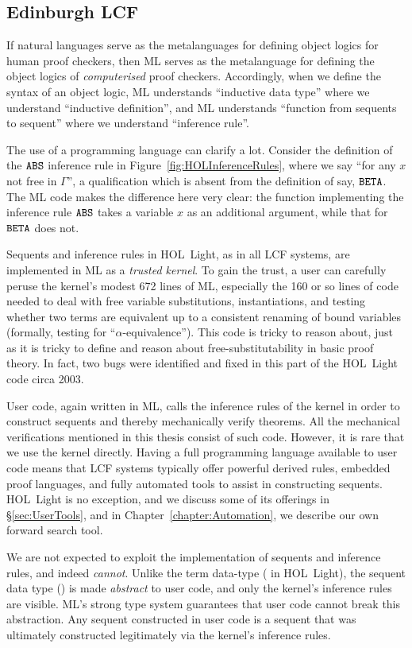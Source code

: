 \subsection{Edinburgh LCF}
If natural languages serve as the metalanguages for defining object logics for human proof checkers, then ML serves as the metalanguage for defining the object logics of \emph{computerised} proof checkers. Accordingly, when we define the syntax of an object logic, ML understands ``inductive data type'' where we understand ``inductive definition'', and ML understands ``function from sequents to sequent'' where we understand ``inference rule''.

The use of a programming language can clarify a lot. Consider the definition of the $\texttt{ABS}$ inference rule in Figure~\ref{fig:HOLInferenceRules}, where we say ``for any $x$ not free in $\Gamma$'', a qualification which is absent from the definition of say, $\texttt{BETA}$. The ML code makes the difference here very clear: the function implementing the inference rule $\texttt{ABS}$ takes a variable $x$ as an additional argument, while that for $\texttt{BETA}$ does not.

Sequents and inference rules in HOL~Light, as in all LCF systems, are implemented in ML as a \emph{trusted kernel}. To gain the trust, a user can carefully peruse the kernel's modest 672 lines of ML, especially the 160 or so lines of code needed to deal with free variable substitutions, instantiations, and testing whether two terms are equivalent up to a consistent renaming of bound variables (formally, testing for ``$\alpha$-equivalence''). This code is tricky to reason about, just as it is tricky to define and reason about free-substitutability in basic proof theory. In fact, two bugs were identified and fixed in this part of the HOL~Light code circa 2003.

User code, again written in ML, calls the inference rules of the kernel in order to construct sequents and thereby mechanically verify theorems. All the mechanical verifications mentioned in this thesis consist of such code. However, it is rare that we use the kernel directly. Having a full programming language available to user code means that LCF systems typically offer powerful derived rules, embedded proof languages, and fully automated tools to assist in constructing sequents. HOL~Light is no exception, and we discuss some of its offerings in \S\ref{sec:UserTools}, and in Chapter~\ref{chapter:Automation}, we describe our own forward search tool.

We are not expected to exploit the implementation of sequents and inference rules, and indeed \emph{cannot}. Unlike the term data-type ( in HOL~Light), the sequent data type () is made \emph{abstract} to user code, and only the kernel's inference rules are visible. ML's strong type system guarantees that user code cannot break this abstraction. Any sequent constructed in user code is a sequent that was ultimately constructed legitimately via the kernel's inference rules.

